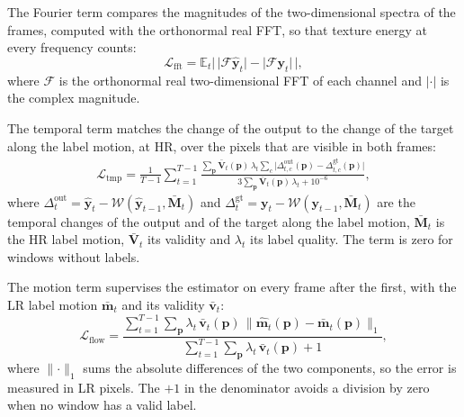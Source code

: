 The Fourier term compares the magnitudes of the two-dimensional spectra of the frames, computed with the orthonormal real FFT, so that texture energy at every frequency counts:
\begin{equation}\label{eq:tsrm-lfft}
\mathcal{L}_\mathrm{fft}=\mathbb{E}_t\Big|\,\big|\mathcal{F}\hat{\mathbf{y}}_t\big|-\big|\mathcal{F}\mathbf{y}_t\big|\,\Big|,
\end{equation}
where $\mathcal{F}$ is the orthonormal real two-dimensional FFT of each channel and $|\cdot|$ is the complex magnitude.

The temporal term matches the change of the output to the change of the target along the label motion, at HR, over the pixels that are visible in both frames:
\begin{multline}\label{eq:tsrm-ltmp}
\mathcal{L}_\mathrm{tmp}=\frac{1}{T-1}\sum_{t=1}^{T-1}\frac{\sum_{\mathbf{p}}\bar{\mathbf{V}}_t(\mathbf{p})\,\lambda_t\sum_{c}\big|\Delta^{\mathrm{out}}_{t,c}(\mathbf{p})-\Delta^{\mathrm{gt}}_{t,c}(\mathbf{p})\big|}{3\sum_{\mathbf{p}}\bar{\mathbf{V}}_t(\mathbf{p})\,\lambda_t+10^{-6}},
\end{multline}
where $\Delta^{\mathrm{out}}_t=\hat{\mathbf{y}}_t-\mathcal{W}(\hat{\mathbf{y}}_{t-1},\bar{\mathbf{M}}_t)$ and $\Delta^{\mathrm{gt}}_t=\mathbf{y}_t-\mathcal{W}(\mathbf{y}_{t-1},\bar{\mathbf{M}}_t)$ are the temporal changes of the output and of the target along the label motion, $\bar{\mathbf{M}}_t$ is the HR label motion, $\bar{\mathbf{V}}_t$ its validity and $\lambda_t$ its label quality. The term is zero for windows without labels.

The motion term supervises the estimator on every frame after the first, with the LR label motion $\bar{\mathbf{m}}_t$ and its validity $\bar{\mathbf{v}}_t$:
\begin{equation}\label{eq:tsrm-lflow}
\mathcal{L}_\mathrm{flow}=\frac{\sum_{t=1}^{T-1}\sum_{\mathbf{p}}\lambda_t\,\bar{\mathbf{v}}_t(\mathbf{p})\,\big\lVert\hat{\mathbf{m}}_t(\mathbf{p})-\bar{\mathbf{m}}_t(\mathbf{p})\big\rVert_1}{\sum_{t=1}^{T-1}\sum_{\mathbf{p}}\lambda_t\,\bar{\mathbf{v}}_t(\mathbf{p})+1},
\end{equation}
where $\lVert\cdot\rVert_1$ sums the absolute differences of the two components, so the error is measured in LR pixels. The $+1$ in the denominator avoids a division by zero when no window has a valid label.

